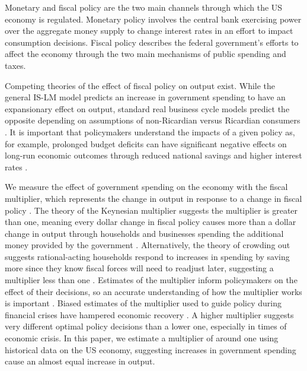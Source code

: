 
Monetary and fiscal policy are the two main channels through which the US economy is regulated.  Monetary policy involves the central bank exercising power over the aggregate money supply to change interest rates in an effort to impact consumption decisions.  Fiscal policy describes the federal government's efforts to affect the economy through the two main mechanisms of public spending and taxes.  



Competing theories of the effect of fiscal policy on output exist.  While the general IS-LM model predicts an increase in government spending to have an expansionary effect on output, standard real business cycle models predict the opposite depending on assumptions of non-Ricardian versus Ricardian consumers \parencite{gali2007understanding}.  It is important that policymakers understand the impacts of a given policy as, for example, prolonged budget deficits can have significant negative effects on long-run economic outcomes through reduced national savings and higher interest rates \parencite{gale2003economic}.

We measure the effect of government spending on the economy with the fiscal multiplier, which represents the change in output in response to a change in fiscal policy \parencite{spilimbergo2009fiscal}.  The theory of the Keynesian multiplier suggests the multiplier is greater than one, meaning every dollar change in fiscal policy causes more than a dollar change in output through households and businesses spending the additional money provided by the government \parencite{barro2011macroeconomic}.  Alternatively, the theory of crowding out suggests rational-acting households respond to increases in spending by saving more since they know fiscal forces will need to readjust later, suggesting a multiplier less than one \parencite{berge2021fiscal}.  Estimates of the multiplier inform policymakers on the effect of their decisions, so an accurate understanding of how the multiplier works is important \parencite{eyraud2013challenge}.  Biased estimates of the multiplier used to guide policy during financial crises have hampered economic recovery \parencites{blanchard2013growth}{blanchard2014learning}.  A higher multiplier suggests very different optimal policy decisions than a lower one, especially in times of economic crisis.  In this paper, we estimate a multiplier of around one using historical data on the US economy, suggesting increases in government spending cause an almost equal increase in output.

